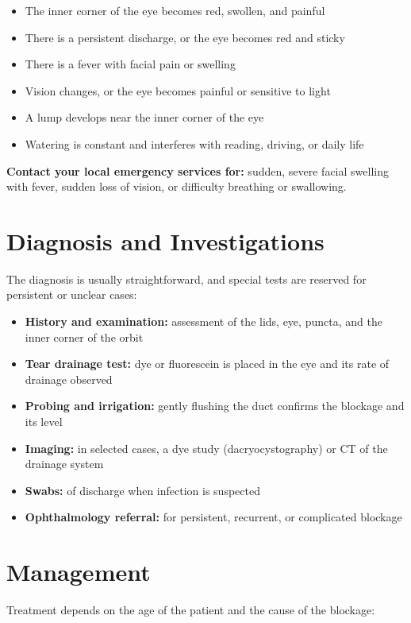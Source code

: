 \begin{itemize}
    \item The inner corner of the eye becomes red, swollen, and painful
    \item There is a persistent discharge, or the eye becomes red and sticky
    \item There is a fever with facial pain or swelling
    \item Vision changes, or the eye becomes painful or sensitive to light
    \item A lump develops near the inner corner of the eye
    \item Watering is constant and interferes with reading, driving, or daily life
\end{itemize}

\textbf{Contact your local emergency services for:} sudden, severe facial swelling with fever, sudden loss of vision, or difficulty breathing or swallowing.

\section*{Diagnosis and Investigations}
The diagnosis is usually straightforward, and special tests are reserved for persistent or unclear cases:

\begin{itemize}
    \item \textbf{History and examination:} assessment of the lids, eye, puncta, and the inner corner of the orbit
    \item \textbf{Tear drainage test:} dye or fluorescein is placed in the eye and its rate of drainage observed
    \item \textbf{Probing and irrigation:} gently flushing the duct confirms the blockage and its level
    \item \textbf{Imaging:} in selected cases, a dye study (dacryocystography) or CT of the drainage system
    \item \textbf{Swabs:} of discharge when infection is suspected
    \item \textbf{Ophthalmology referral:} for persistent, recurrent, or complicated blockage
\end{itemize}

\section*{Management}
Treatment depends on the age of the patient and the cause of the blockage:

